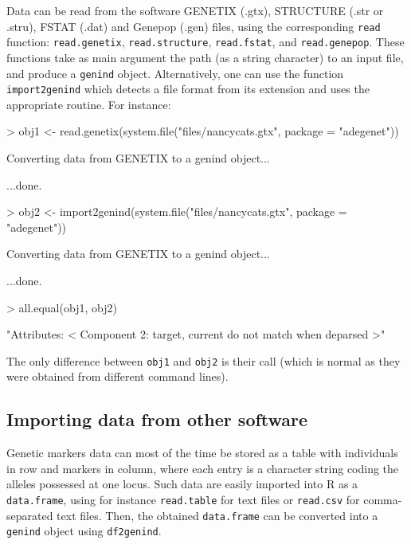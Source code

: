 \documentclass{article}
\begin{document}
Data can be read from the software GENETIX (.gtx), STRUCTURE (.str or
.stru), FSTAT (.dat) and Genepop (.gen) files, using the corresponding
\texttt{read} function: \texttt{read.genetix},  \texttt{read.structure},
\texttt{read.fstat}, and  \texttt{read.genepop}.
These functions take as main argument the path (as a string character) to an input file, and produce a \texttt{genind} object.
Alternatively, one can use the function \texttt{import2genind} which detects a file format from its extension and uses the appropriate routine.
For instance:
\begin{Schunk}
\begin{Sinput}
> obj1 <- read.genetix(system.file("files/nancycats.gtx", package = "adegenet"))
\end{Sinput}
\begin{Soutput}
 Converting data from GENETIX to a genind object... 

...done.
\end{Soutput}
\begin{Sinput}
> obj2 <- import2genind(system.file("files/nancycats.gtx", package = "adegenet"))
\end{Sinput}
\begin{Soutput}
 Converting data from GENETIX to a genind object... 

...done.
\end{Soutput}
\begin{Sinput}
> all.equal(obj1, obj2)
\end{Sinput}
\begin{Soutput}
[1] "Attributes: < Component 2: target, current do not match when deparsed >"
\end{Soutput}
\end{Schunk}

\noindent The only difference between \texttt{obj1} and \texttt{obj2} is
their call (which is normal as they were obtained from different
command lines).




\subsection{Importing data from other software}
Genetic markers data can most of the time be stored as a table with individuals in row and markers
in column, where each entry is a character string coding the alleles possessed at one locus.
Such data are easily imported into R as a \texttt{data.frame}, using for instance \texttt{read.table}
for text files or \texttt{read.csv} for comma-separated text files.
Then, the obtained \texttt{data.frame} can be converted into a \texttt{genind} object using \texttt{df2genind}.
\\
\end{document}

